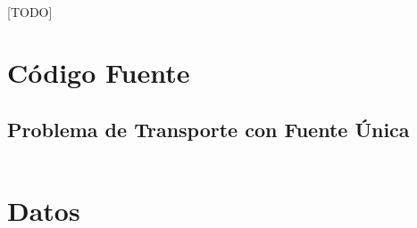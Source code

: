 \documentclass[a4paper, spanish]{article}
\begin{document}
    \paragraph{}
    [TODO]


  \begin{appendices}

    \section{Código Fuente}

      \subsection{Problema de Transporte con Fuente Única}
      \label{appendix:source-code}

        \inputminted{text}{./../mosel/single-source-transportation-problem.mos}

    \section{Datos}
    \label{appendix:data}

      \inputminted{text}{./../mosel/data.dat}

  \end{appendices}






  \nocite{subject:pent2017}
  \nocite{tool:xpress-mosel}
  \nocite{repository:network-flow-transeuro}

  
  
\end{document}
